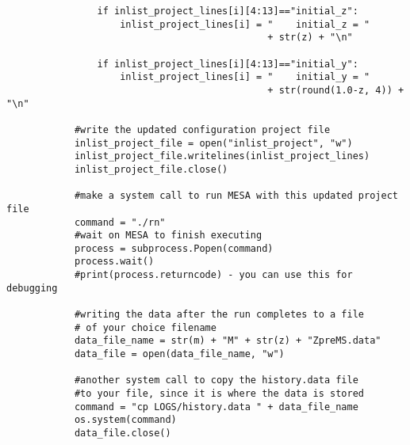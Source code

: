 \documentclass[12pt,hidelinks]{article}
\begin{document}
\begin{lstlisting}
                if inlist_project_lines[i][4:13]=="initial_z":
                    inlist_project_lines[i] = "    initial_z = "
                                              + str(z) + "\n"

                if inlist_project_lines[i][4:13]=="initial_y":
                    inlist_project_lines[i] = "    initial_y = "
                                              + str(round(1.0-z, 4)) + "\n"

            #write the updated configuration project file
            inlist_project_file = open("inlist_project", "w")
            inlist_project_file.writelines(inlist_project_lines)
            inlist_project_file.close()

            #make a system call to run MESA with this updated project file
            command = "./rn"
            #wait on MESA to finish executing
            process = subprocess.Popen(command)
            process.wait()
            #print(process.returncode) - you can use this for debugging

            #writing the data after the run completes to a file
            # of your choice filename
            data_file_name = str(m) + "M" + str(z) + "ZpreMS.data"
            data_file = open(data_file_name, "w")

            #another system call to copy the history.data file
            #to your file, since it is where the data is stored
            command = "cp LOGS/history.data " + data_file_name
            os.system(command)
            data_file.close()
		\end{lstlisting}
		
\end{document}
